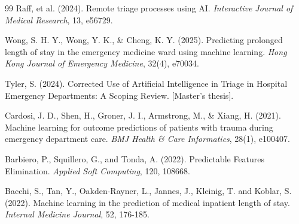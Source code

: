 \documentclass[harvard,article]{frontiersinFPHY_FAMS}
\begin{document}
\begin{thebibliography}{99}
 Raff, et al. (2024). Remote triage processes using AI. \textit{Interactive Journal of Medical Research}, 13, e56729.

 Wong, S. H. Y., Wong, Y. K., \& Cheng, K. Y. (2025). Predicting prolonged length of stay in the emergency medicine ward using machine learning. \textit{Hong Kong Journal of Emergency Medicine}, 32(4), e70034.

 Tyler, S. (2024). Corrected Use of Artificial Intelligence in Triage in Hospital Emergency Departments: A Scoping Review. [Master's thesis].

 Cardosi, J. D., Shen, H., Groner, J. I., Armstrong, M., \& Xiang, H. (2021). Machine learning for outcome predictions of patients with trauma during emergency department care. \textit{BMJ Health \& Care Informatics}, 28(1), e100407.

 Barbiero, P., Squillero, G., and Tonda, A. (2022). Predictable Features Elimination. \textit{Applied Soft Computing}, 120, 108668.

 Bacchi, S., Tan, Y., Oakden-Rayner, L., Jannes, J., Kleinig, T. and Koblar, S. (2022). Machine learning in the prediction of medical inpatient length of stay. \textit{Internal Medicine Journal}, 52, 176-185.

\end{thebibliography}
\end{document}
